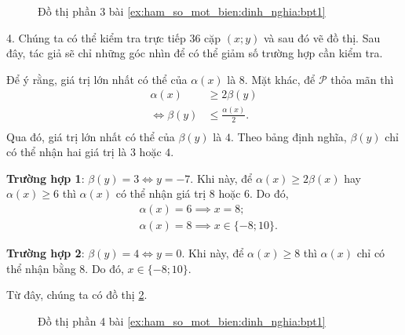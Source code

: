 \begin{figure}[H]
   \centering
   \caption{Đồ thị phần 3 bài \ref{ex:ham_so_mot_bien:dinh_nghia:bpt1}}
   \label{fig:ham_so_mot_bien:dinh_nghia:bpt3}
\end{figure}

4. Chúng ta có thể kiểm tra trực tiếp $36$ cặp $(x; y)$ và sau đó vẽ đồ thị. Sau đây, tác giả sẽ chỉ những góc nhìn để có thể giảm số trường hợp cần kiểm tra.

Để ý rằng, giá trị lớn nhất có thể của $\alpha(x)$ là $8$. Mặt khác, để $\mathcal{P}$ thỏa mãn thì
\begin{align*}
   \alpha(x) &\geq 2\beta(y) \\
   \iff \beta(y) &\leq \frac{\alpha(x)}{2}. \\
\end{align*}
Qua đó, giá trị lớn nhất có thể của $\beta(y)$ là $4$. Theo bảng định nghĩa, $\beta(y)$ chỉ có thể nhận hai giá trị là $3$ hoặc $4$. 

\textbf{Trường hợp 1}: $\beta(y) = 3 \iff y = -7$. Khi này, để $\alpha(x) \geq 2\beta(x)$ hay $\alpha(x) \geq 6$ thì $\alpha(x)$ có thể nhận giá trị $8$ hoặc $6$. Do đó,
\begin{align*}
   &\alpha(x) = 6 \implies x = 8;\\
   &\alpha(x) = 8 \implies x \in \{-8; 10\}.
\end{align*}

\textbf{Trường hợp 2}: $\beta(y) = 4 \iff y = 0$. Khi này, để $\alpha(x) \geq 8$ thì $\alpha(x)$ chỉ có thể nhận bằng $8$. Do đó, $x \in \{-8; 10\}$.

Từ đây, chúng ta có đồ thị \ref{fig:ham_so_mot_bien:dinh_nghia:bpt4}.

\begin{figure}[H]
   \centering
   \caption{Đồ thị phần 4 bài \ref{ex:ham_so_mot_bien:dinh_nghia:bpt1}}
   \label{fig:ham_so_mot_bien:dinh_nghia:bpt4}
\end{figure}

